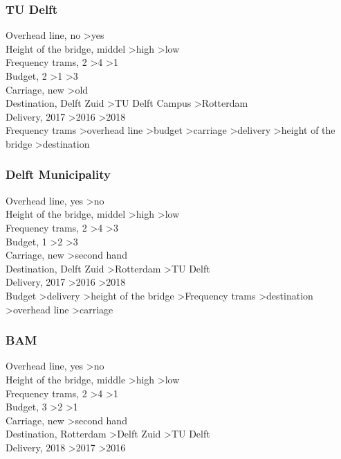 \documentclass{article}
\begin{document}
\subsubsection*{TU Delft}
Overhead line, no \textgreater yes \\
Height of the bridge, middel  \textgreater high \textgreater low \\
Frequency trams, 2 \textgreater 4 \textgreater 1 \\
Budget, 2 \textgreater 1 \textgreater 3 \\
Carriage, new \textgreater old \\
Destination, Delft Zuid \textgreater TU Delft Campus \textgreater Rotterdam \\
Delivery, 2017 \textgreater 2016 \textgreater 2018 \\

Frequency trams \textgreater overhead line \textgreater budget \textgreater carriage \textgreater delivery \textgreater height of the bridge \textgreater destination \\

\subsubsection*{Delft Municipality}
Overhead line, yes \textgreater no\\
Height of the bridge, middel \textgreater high \textgreater low \\
Frequency trams, 2 \textgreater 4 \textgreater 3 \\
Budget, 1 \textgreater 2 \textgreater 3\\
Carriage, new \textgreater second hand\\
Destination, Delft Zuid \textgreater Rotterdam \textgreater TU Delft\\
Delivery, 2017 \textgreater 2016 \textgreater 2018\\

Budget \textgreater delivery \textgreater height of the bridge \textgreater Frequency trams \textgreater destination \textgreater overhead line \textgreater carriage\\

\subsubsection*{BAM}
Overhead line, yes \textgreater no\\
Height of the bridge, middle \textgreater high \textgreater low\\
Frequency trams, 2 \textgreater 4 \textgreater 1\\
Budget, 3 \textgreater 2 \textgreater 1\\
Carriage, new \textgreater second hand\\
Destination, Rotterdam \textgreater Delft Zuid \textgreater TU Delft\\
Delivery, 2018 \textgreater 2017 \textgreater 2016 \\
\end{document}

